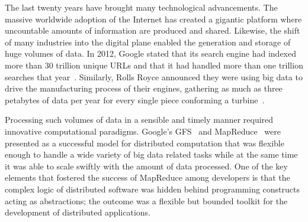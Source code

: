 \label{ch:introduction}




The last twenty years have brought many technological advancements. The massive worldwide adoption of the Internet has created a gigantic platform where uncountable amounts of information are produced and shared. Likewise, the shift of many industries into the digital plane enabled the generation and storage of huge volumes of data. In 2012, Google stated that its search engine had indexed more than 30 trillion unique URLs and that it had handled more than one trillion searches that year~\cite{WebGoogleZeitgeist2017}. Similarly, Rolls Royce announced they were using big data to drive the manufacturing process of their engines, gathering as much as three petabytes of data per year for every single piece conforming a turbine~\cite{WebForbes2017,WebRollsRoyce2017}.


Processing such volumes of data in a sensible and timely manner required innovative computational paradigms. Google's GFS~\cite{Ghemawat2003} and MapReduce~\cite{Dean2004} were presented as a successful model for distributed computation that was flexible enough to handle a wide variety of big data related tasks while at the same time it was able to scale swiftly with the amount of data processed. One of the key elements that fostered the success of MapReduce among developers is that the complex logic of distributed software was hidden behind programming constructs acting as abstractions; the outcome was a flexible but bounded toolkit for the development of distributed applications.

